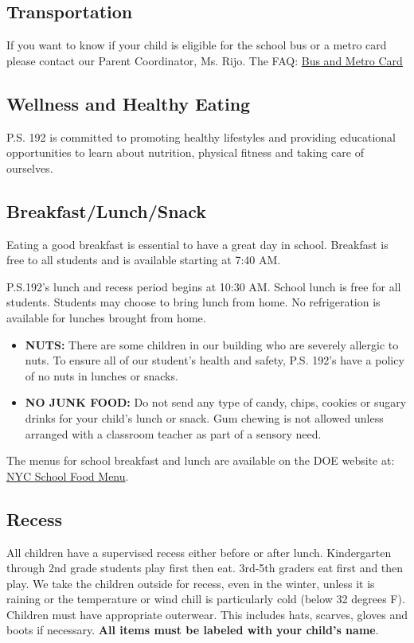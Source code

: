 \documentclass[11pt, letterpaper]{article}
\begin{document}
\subsection{Transportation}
If you want to know if your child is eligible for the school bus or a metro card please contact our Parent Coordinator, Ms. Rijo. The FAQ: \hyperref[secondappendix]{Bus and Metro Card}

\subsection{Wellness and Healthy Eating}
P.S. 192 is committed to promoting healthy lifestyles and providing educational opportunities to learn about nutrition, physical fitness and taking care of ourselves.

\subsection{Breakfast/Lunch/Snack} 
Eating a good breakfast is essential to have a great day in school. Breakfast is free to all students and is available starting at 7:40 AM. 

P.S.192's lunch and recess period begins at 10:30 AM. School lunch is free for all students. Students may choose to bring lunch from home. No refrigeration is available for lunches brought from home. 
\begin{itemize}
\item \textbf{NUTS:} There are some children in our building who are severely allergic to nuts. To ensure all of our student's health and safety, P.S. 192's have a policy of no nuts in lunches or snacks. 
\item \textbf{NO JUNK FOOD:} Do not send any type of candy, chips, cookies or sugary drinks for your child’s lunch or snack. Gum chewing is not allowed unless arranged with a classroom teacher as part of a sensory need.
\end{itemize}

The menus for school breakfast and lunch are available on the DOE website at: \href{https://www.schools.nyc.gov/school-life/food/menus}{NYC School Food Menu}.  

\subsection{Recess}
All children have a supervised recess either before or after lunch. Kindergarten through 2nd grade students play first then eat. 3rd-5th graders eat first and then play. We take the children outside for recess, even in the winter, unless it is raining or the temperature or wind chill is particularly cold (below 32 degrees F). Children must have appropriate outerwear. This includes hats, scarves, gloves and boots if necessary. \textbf{All items must be labeled with your child’s name}.
\end{document}
